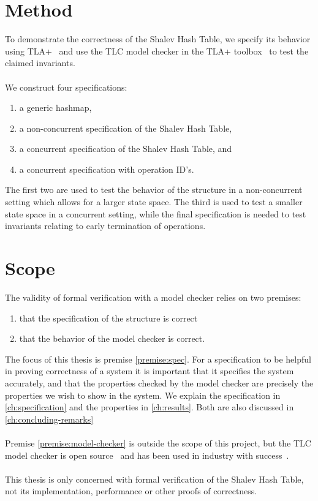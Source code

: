 \documentclass{uit-thesis}
\begin{document}
\section{Method}
To demonstrate the correctness of the Shalev Hash Table, we specify its behavior using TLA+~\cite{Lamport_specifying_2002} and use the TLC model checker in the TLA+ toolbox~\cite{TLAplus} to test the claimed invariants.
\\\\
We construct four specifications:
\begin{enumerate}
    \item a generic hashmap,
    \item a non-concurrent specification of the Shalev Hash Table,
    \item a concurrent specification of the Shalev Hash Table, and
    \item a concurrent specification with operation ID's.
\end{enumerate}
The first two are used to test the behavior of the structure in a non-concurrent setting which allows for a larger state space. The third is used to test a smaller state space in a concurrent setting, while the final specification is needed to test invariants relating to early termination of operations.

\section{Scope}
The validity of formal verification with a model checker relies on two premises:
\begin{enumerate}
    \item that the specification of the structure is correct\label{premise:spec}
    \item that the behavior of the model checker is correct.\label{premise:model-checker}
\end{enumerate}
The focus of this thesis is premise \ref{premise:spec}. For a specification to be helpful in proving correctness of a system it is important that it specifies the system accurately, and that the properties checked by the model checker are precisely the properties we wish to show in the system. We explain the specification in \autoref{ch:specification} and the properties in \autoref{ch:results}. Both are also discussed in \autoref{ch:concluding-remarks}
\\\\
Premise \ref{premise:model-checker} is outside the scope of this project, but the TLC model checker is open source~\cite{TLAplus} and has been used in industry with success~\cite{Amazon2015, Lamport-Batson2002}.
\\\\
This thesis is only concerned with formal verification of the Shalev Hash Table, not its implementation, performance or other proofs of correctness.
\end{document}
